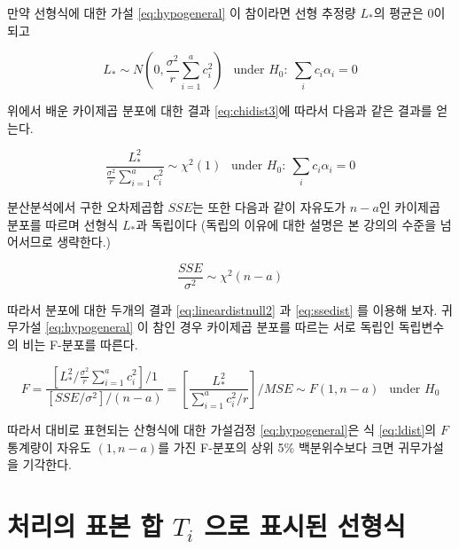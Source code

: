 \documentclass[
]{book}
\begin{document}
만약 선형식에 대한 가설 \eqref{eq:hypogeneral} 이 참이라면 선형 추정량 \(L_*\)의 평균은 0이 되고

\begin{equation}
L_* \sim N \left (0,  \frac{\sigma^2}{r} \sum_{i=1}^a c_i^2\right )~~ \text{ under } H_0: ~  \sum_i c_i \alpha_i =0
\label{eq:lineardistnull}
\end{equation}

위에서 배운 카이제곱 분포에 대한 결과 \eqref{eq:chidist3}에 따라서 다음과 같은 결과를 얻는다.

\begin{equation}
\frac{L_*^2}{\tfrac{\sigma^2}{r} \sum_{i=1}^a c_i^2 } \sim \chi^2(1) ~~\text{ under } H_0: ~  \sum_i c_i \alpha_i =0
\label{eq:lineardistnull2}
\end{equation}

분산분석에서 구한 오차제곱합 \(SSE\)는 또한 다음과 같이 자유도가 \(n-a\)인 카이제곱 분포를 따르며 선형식 \(L_*\)과 독립이다 (독립의 이유에 대한 설명은 본 강의의 수준을 넘어서므로 생략한다.)

\begin{equation}
\frac{SSE}{\sigma^2} \sim \chi^2(n-a) 
\label{eq:ssedist}
\end{equation}

따라서 분포에 대한 두개의 결과 \eqref{eq:lineardistnull2} 과 \eqref{eq:ssedist} 를 이용해 보자. 귀무가설 \eqref{eq:hypogeneral} 이 참인 경우 카이제곱 분포를 따르는 서로 독립인 독립변수의 비는 F-분포를 따른다.

\begin{equation}
F = \frac{  \left [ L_*^2 / \tfrac{\sigma^2}{r} \sum_{i=1}^a c_i^2 \right ] /1} { \left [ SSE/ \sigma^2  \right ] / (n-a)}
=  \left[ \frac{L_*^2}{\sum_{i=1}^a c_i^2/r } \right ] / MSE  \sim F(1, n-a) ~~\text{ under } H_0
\label{eq:ldist}
\end{equation}

따라서 대비로 표현되는 산형식에 대한 가설검정 \eqref{eq:hypogeneral}은 식 \eqref{eq:ldist}의 \(F\) 통계량이
자유도 \((1,n-a)\)를 가진 F-분포의 상위 5\% 백분위수보다 크면 귀무가설을 기각한다.

\hypertarget{uxcc98uxb9acuxc758-uxd45cuxbcf8-uxd569-t_i-uxc73cuxb85c-uxd45cuxc2dcuxb41c-uxc120uxd615uxc2dd}{%
\section{\texorpdfstring{처리의 표본 합 \(T_i\) 으로 표시된 선형식}{처리의 표본 합 T\_i 으로 표시된 선형식}}\label{uxcc98uxb9acuxc758-uxd45cuxbcf8-uxd569-t_i-uxc73cuxb85c-uxd45cuxc2dcuxb41c-uxc120uxd615uxc2dd}}
\end{document}
